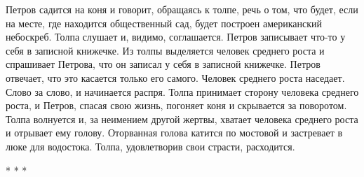 Петров садится на коня и говорит, обращаясь к толпе, речь о том, что будет, если на месте, где находится общественный сад, будет построен американский небоскреб. Толпа слушает и, видимо, соглашается. Петров записывает что-то у себя в записной книжечке. Из толпы выделяется человек среднего роста и спрашивает Петрова, что он записал у себя в записной книжечке. Петров отвечает, что это касается только его самого. Человек среднего роста наседает. Слово за слово, и начинается распря. Толпа принимает сторону человека среднего роста, и Петров, спасая свою жизнь, погоняет коня и скрывается за поворотом. Толпа волнуется и, за неимением другой жертвы, хватает человека среднего роста и отрывает ему голову. Оторванная голова катится по мостовой и застревает в люке для водостока. Толпа, удовлетворив свои страсти, расходится.


\begin{center}
* * *
\end{center}
